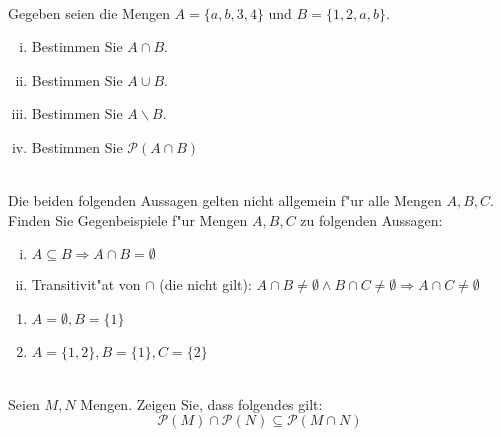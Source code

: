 \newcommand{\printpraesenzlsg}{false}
\newcommand{\printloesungen}{false}
\newcommand{\printbewertungen}{false}
\newcommand{\blattnummer}{1}




\iforiginal{}
\\
Gegeben seien die Mengen $A=\{a,b,3,4\}$ und $B=\{1,2,a,b\}$.
\begin{enumerate}[(i)]
    \item Bestimmen Sie $A\cap B$.
    \item Bestimmen Sie $A\cup B$.
    \item Bestimmen Sie $A\backslash B$.
    \item Bestimmen Sie $\mathscr{P}(A\cap B)$
    
\end{enumerate}

\\
Die beiden folgenden Aussagen gelten nicht allgemein f"ur alle Mengen $A,B,C$. Finden Sie Gegenbeispiele f"ur Mengen $A,B,C$ zu folgenden Aussagen:
\begin{enumerate}[(i)]
\item $A\subseteq B\Rightarrow A\cap B=\emptyset$
\item Transitivit"at  von $\cap$ (die nicht gilt): $A\cap B\neq\emptyset\wedge B\cap C\neq\emptyset\Rightarrow A\cap C\neq\emptyset$
\end{enumerate}

\begin{loesung}
\begin{enumerate}
\item $A=\emptyset, B=\{1\}$
\item $A=\{1,2\},B=\{1\}, C=\{2\}$
\end{enumerate}
\end{loesung}

\\
Seien $M,N$ Mengen. Zeigen Sie, dass folgendes gilt:
\[\mathscr{P}(M)\cap\mathscr{P}(N)\subseteq \mathscr{P}(M\cap N)\]


